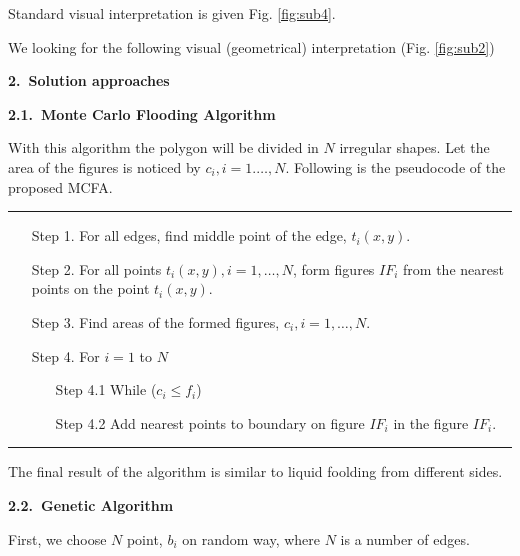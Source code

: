 \documentclass[11pt,leqno]{book}
\newcommand{\sect}[1]{\vskip7mm\par{\large \bf #1}}
\newcommand{\subsect}[1]{\vskip 3mm\par{\bf#1}}
\begin{document}
Standard visual interpretation is given Fig. \ref{fig:sub4}.

We looking for the following visual (geometrical) interpretation (Fig. \ref{fig:sub2})

\sect{2.~Solution approaches}

\subsect{2.1.~Monte Carlo Flooding Algorithm}

With this algorithm the polygon will be divided in $N$ irregular shapes. Let the area of the figures is noticed by $c_i, i = 1. \ldots, N$.  Following is the pseudocode of the proposed MCFA.

\noindent\rule{\textwidth}{1pt}
\begin{itemize}
\item[Step 1.]  For all edges, find middle point of the edge, $t_i(x,y)$.
\item[Step 2.]  For all points $t_i(x,y), i=1,\ldots, N$, form figures $IF_i$ from the nearest points on the point $t_i(x,y)$. 
\item[Step 3.] Find areas of the formed figures, $c_i, i = 1, \ldots, N$.
\item[Step 4.] For $i = 1$ to $N$
\begin{itemize}
  \item[Step 4.1]  While ($c_i \leq f_i$)
  \item[Step 4.2]  Add nearest points to boundary on figure $IF_i$ in the figure $IF_i$. 
\end{itemize}
\end{itemize}
\noindent\rule{\textwidth}{1pt}

The final result of the algorithm is similar to liquid foolding from different sides.

\subsect{2.2.~Genetic Algorithm}

First, we choose $N$ point, $b_i$  on random way, where $N$ is a number of edges.
\end{document}
